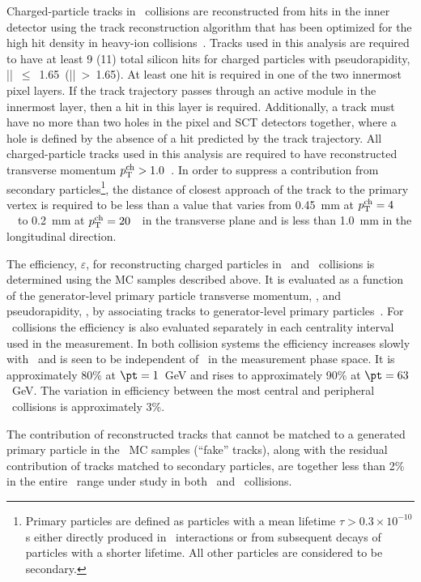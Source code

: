 Charged-particle tracks in \pbpb\ collisions are reconstructed from hits in the inner detector using the 
track reconstruction algorithm that has been optimized for the high hit density in heavy-ion
collisions~\cite{Aaboud:2017all}.
Tracks used in this analysis  are required to have at least 9 (11) total silicon hits for charged particles with pseudorapidity,  \mbox{|\etatrk| $\leq$ 1.65 (|\etatrk| > 1.65)}.  At least one hit is required in one of the two innermost pixel layers.
If the track trajectory passes through an active module in the innermost layer, then 
a hit in this layer is required. Additionally, a track must 
have no more than two holes in the pixel and SCT detectors together, where 
a hole is defined by the absence of a hit predicted by the track 
trajectory. 
All charged-particle tracks used in this analysis are required to have reconstructed transverse momentum $\mbox{$p_{\mathrm{T}}^{\mathrm{ch}}$} > 1.0 $~\GeV. In order to suppress a contribution from
secondary particles\footnote{Primary particles are defined as particles with a mean lifetime $\tau>0.3\times 10^{-10}$s either directly produced in \pp\ interactions or from subsequent decays of particles with a shorter lifetime. All other particles are considered to be secondary.}, the distance of closest approach of the track to the primary vertex is required to be less than a value that varies from 0.45~mm at $\mbox{$p_{\mathrm{T}}^{\mathrm{ch}}$}=4$~\GeV\ to 0.2~mm at $\mbox{$p_{\mathrm{T}}^{\mathrm{ch}}$}=20$~\GeV\ in the transverse plane and is less than 1.0~mm in the longitudinal direction.


The efficiency, $\varepsilon$, for reconstructing charged particles in \PbPb\ and \pp\ collisions is determined using the MC samples described above. It is evaluated as a function of the generator-level primary particle transverse momentum, \pTtrue, and pseudorapidity, \etatrue, by associating tracks to generator-level primary particles~\cite{Aad:2010ah}. For \pbpb\ collisions the efficiency is also evaluated separately in each centrality interval used in the measurement. In both collision systems the efficiency increases slowly with \pTtrue\ and is seen to be independent of \ptjet\ in the measurement phase space. It is approximately 80\% at \mbox{$\pt = 1$ GeV} and rises to approximately 90\% at \mbox{$\pt = 63$ GeV}. The variation in efficiency between the most central and peripheral \pbpb\ collisions is approximately 3\%.

The contribution of reconstructed tracks that cannot be matched to a generated primary particle in the \pp\ MC samples (``fake'' tracks), along with the residual contribution of tracks matched to secondary particles, are together less than 2\% in the entire \pttrk\ range under study in both \pp\ and \pbpb\ collisions.  








